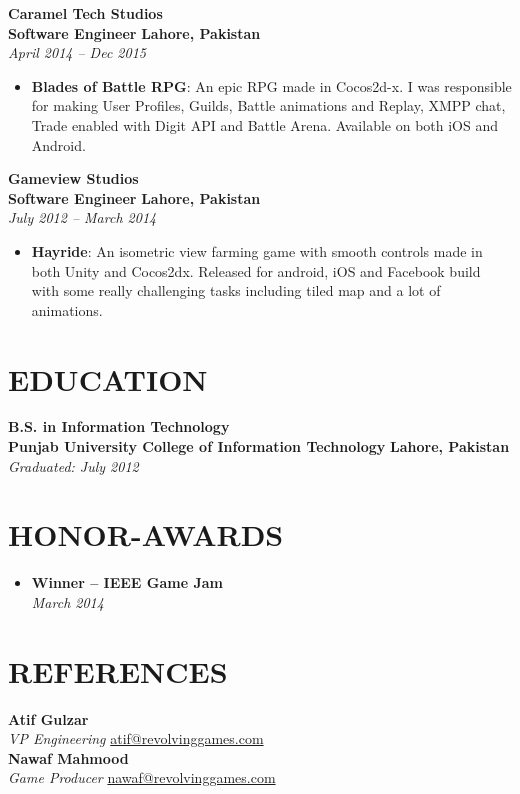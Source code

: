\documentclass[11pt]{article}
\begin{document}
\textbf{Caramel Tech Studios} \\
\textbf{Software Engineer} \hfill \textbf{Lahore, Pakistan} \\
\textit{April 2014 -- Dec 2015}
\begin{itemize}
	\item \textbf{Blades of Battle RPG}: An epic RPG made in Cocos2d-x. I was responsible for making User Profiles, Guilds, Battle animations and Replay, XMPP chat, Trade enabled with Digit API and Battle Arena. Available on both iOS and Android.
\end{itemize}
\textbf{Gameview Studios} \\
\textbf{Software Engineer} \hfill \textbf{Lahore, Pakistan} \\
\textit{July 2012 -- March 2014}
\begin{itemize}
	\item \textbf{Hayride}: An isometric view farming game with smooth controls made in both Unity and Cocos2dx. Released for android, iOS and Facebook build with some really challenging tasks including tiled map and a lot of animations.
\end{itemize}

\section*{EDUCATION}
\textbf{B.S. in Information Technology}  \\ 
\textbf{Punjab University College of Information Technology} \hfill \textbf{Lahore, Pakistan}\\
\textit{Graduated: July 2012} 

\section*{HONOR-AWARDS}
\begin{itemize}
    \item \textbf{Winner -- IEEE Game Jam} \\
    \textit{March 2014}
\end{itemize}

\section*{REFERENCES}
\textbf{Atif Gulzar} \\
\textit{VP Engineering} \href{mailto:atif@revolvinggames.com}{atif@revolvinggames.com}\\
\textbf{Nawaf Mahmood} \\
\textit{Game Producer} \href{mailto:nawaf@revolvinggames.com}{nawaf@revolvinggames.com}\\
\end{document}
